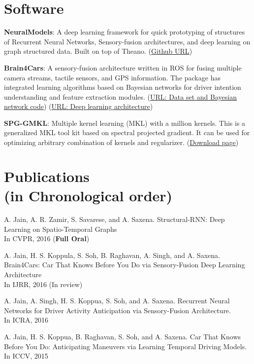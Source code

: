 \documentclass[line,margin]{res}
\begin{document}
\begin{resume}
 \section{Software}
 
 \textbf{NeuralModels}: A deep learning framework for quick prototyping of structures of Recurrent Neural Networks, Sensory-fusion architectures, and deep learning on graph structured data. Built on top of Theano.   (\href{https://github.com/asheshjain399/NeuralModels}{Github URL})
 
 \textbf{Brain4Cars}: A sensory-fusion architecture written in ROS for fusing
 multiple camera streams, tactile sensors, and GPS information. The package has
 integrated learning algorithms based on Bayesian networks for driver intention
 understanding and feature extraction modules.
 (\href{https://github.com/asheshjain399/ICCV2015_Brain4Cars}{URL: Data set and
 Bayesian network code}) (\href{https://github.com/asheshjain399/RNNexp}{URL: Deep
 learning architecture})

\textbf{SPG-GMKL}: Multiple kernel learning (MKL) with a million kernels. This is a generalized MKL tool kit based on spectral projected gradient. It can be used for optimizing arbitrary combination of kernels and regularizer. (\href{http://www.cs.cornell.edu/~ashesh/pubs/code/SPG-GMKL/download.html}{Download page})  
 \section{Publications\\ (in Chronological order)} 

 		A. Jain, A. R. Zamir, S. Savarese, and A. Saxena.
Structural-RNN: Deep Learning on Spatio-Temporal Graphs\\In CVPR, 2016 (\textbf{Full Oral}) 

  		A. Jain, H. S. Koppula, S. Soh, B. Raghavan, A. Singh, and A. Saxena.
Brain4Cars: Car That Knows Before You Do via Sensory-Fusion Deep Learning Architecture\\In IJRR, 2016 (In review) 

		A. Jain, A. Singh, H. S. Koppua, S. Soh, and A. Saxena.
Recurrent Neural Networks for Driver Activity Anticipation via Sensory-Fusion Architecture.\\ In ICRA, 2016
 
		A. Jain, H. S. Koppua, B. Raghavan, S. Soh, and A. Saxena.
Car That Knows Before You Do: Anticipating Maneuvers via Learning Temporal Driving Models.\\In ICCV, 2015 



\end{resume}
\end{document}
